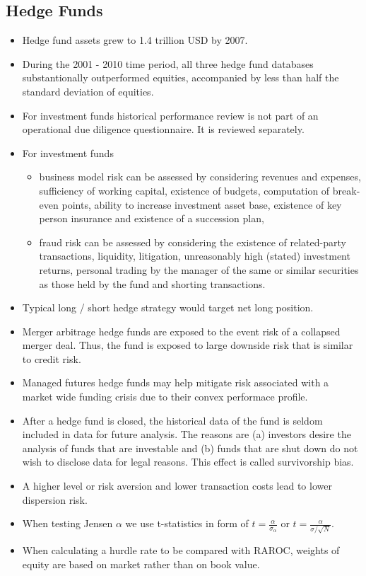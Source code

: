 \subsection{Hedge Funds}
\begin{itemize}
	\item Hedge fund assets grew to 1.4 trillion USD by 2007.
	\item During the 2001 - 2010 time period, all three hedge fund databases substantionally outperformed equities, accompanied by less than half the standard deviation of equities.
	\item For investment funds historical performance review is not part of an operational due diligence questionnaire. It is reviewed separately.
	\item For investment funds
	\begin{itemize}
		\item business model risk can be assessed by considering revenues and expenses, sufficiency of working capital, existence of budgets, computation of break-even points, ability to increase investment asset base, existence of key person insurance and existence of a succession plan,
		\item fraud risk can be assessed by considering the existence of related-party transactions, liquidity, litigation, unreasonably high (stated) investment returns, personal trading by the manager of the same or similar securities as those held by the fund and shorting transactions.
	\end{itemize}
	\item Typical long / short hedge strategy would target net long position.
	\item Merger arbitrage hedge funds are exposed to the event risk of a collapsed merger deal. Thus, the fund is exposed to large downside risk that is similar to credit risk.
	\item Managed futures hedge funds may help mitigate risk associated with a market wide funding crisis due to their convex performace profile.
	\item After a hedge fund is closed, the historical data of the fund is seldom included in data for future analysis. The reasons are (a) investors desire the analysis of funds that are investable and (b) funds that are shut down do not wish to disclose data for legal reasons. This effect is called survivorship bias.
	\item A higher level or risk aversion and lower transaction costs lead to lower dispersion risk.
	\item When testing Jensen $\alpha$ we use t-statistics in form of $t = \frac{\alpha}{\sigma_{\alpha}}$ or $t = \frac{\alpha}{\sigma / \sqrt{N}}$.
	\item When calculating a hurdle rate to be compared with RAROC, weights of equity are based on market rather than on book value.
\end{itemize}

